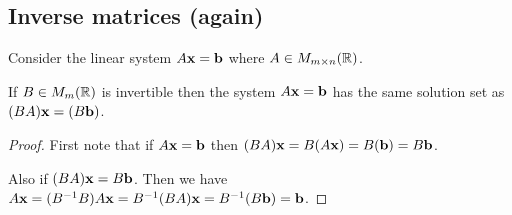 \documentclass[10pt, a4paper]{article}
\begin{document}
\subsection{Inverse matrices (again)}
Consider the linear system $A\mathbf{x} = \mathbf{b}$ where $A \in M_{m \times n}(\mathbb{R})$.
\begin{lemma}
    If $B \in M_m(\mathbb{R})$ is invertible then the system $A\mathbf{x} = \mathbf{b}$ has the same solution set as $(BA)\mathbf{x} = (B\mathbf{b})$.
    \begin{proof}
        First note that if $A\mathbf{x} = \mathbf{b}$ then
        $(BA)\mathbf{x} = B(A\mathbf{x}) = B(\mathbf{b}) = B\mathbf{b}$.

        Also if $(BA)\mathbf{x} = B\mathbf{b}$.
        Then we have
        $A\mathbf{x} = (B ^ {-1} B)A\mathbf{x} = B ^ {-1}(BA)\mathbf{x} = B ^ {-1}(B\mathbf{b}) = \mathbf{b}$.
    \end{proof}
\end{lemma}
\end{document}

